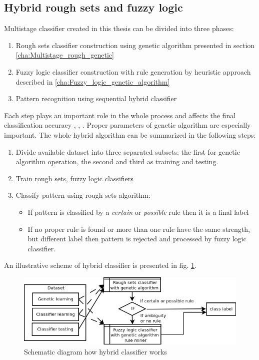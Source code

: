 \subsection{Hybrid rough sets and fuzzy logic}
\label{cha:Multistage_rough_fuzzy}
Multistage classifier created in this thesis can be divided into three phases:
\begin{enumerate}
    \item Rough sets classifier construction using genetic algorithm presented
        in section \ref{cha:Multistage_rough_genetic}
    \item Fuzzy logic classifier construction with rule generation by heuristic
        approach described in \ref{cha:Fuzzy_logic_genetic_algorithm}
    \item Pattern recognition using sequential hybrid classifier 
\end{enumerate}
Each step plays an important role in the whole process and affects the final
classification accuracy \cite{bib12}, \cite{bib27}, \cite{bib32}. Proper parameters of genetic algorithm are especially
important. The whole hybrid algorithm can be summarized in the following steps:
\begin{enumerate}
    \item Divide available dataset into three separated subsets: the first for
        genetic algorithm operation, the second and third as training and
        testing.
    \item Train rough sets, fuzzy logic classifiers
    \item Classify pattern using rough sets algorithm:
        \begin{itemize}
            \item If pattern is classified by a \textit{certain} or
                \textit{possible} rule then it is a final label
            \item If no proper rule is found or more than one rule have the same
                strength, but different label then pattern is rejected and
                processed by fuzzy logic classifier.
        \end{itemize}
\end{enumerate}
An illustrative scheme of hybrid classifier is presented in fig. \ref{fig:schematic}.
\begin{figure}[H]
    \begin{center}
        \includegraphics[width=\textwidth]{fig/diagram.png}
    \end{center}
    \caption{Schematic diagram how hybrid classifier works}
    \label{fig:schematic}
\end{figure}
